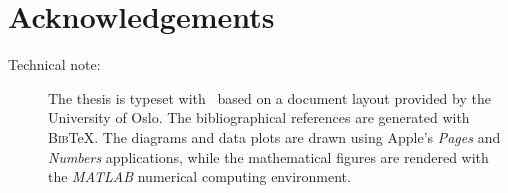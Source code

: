 \chapter*{Acknowledgements}






\null
\vfill
\begin{description}
\item [Technical note: ] The thesis is typeset with \LaTeXe \ based on a document layout provided by the University of Oslo. The bibliographical references are generated with \textsc{Bib}\negthinspace\TeX. The diagrams and data plots are drawn using Apple's \textit{Pages} and \textit{Numbers} applications, while the mathematical figures are rendered with the \textit{MATLAB} numerical computing environment.
\end{description}